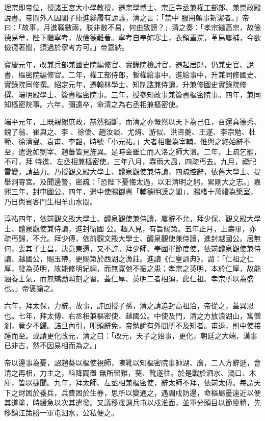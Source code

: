 \begin{pinyinscope}
 理宗即帝位，授諸王宮大小學教授，遷宗學博士、宗正寺丞兼權工部郎、兼崇政殿說書。帝問外人因閣子庫進絲履有謗議，清之言：「禁中
 服用頗事新潔者。」帝曰：「故事，月進鞵數兩，朕非敝不易，何由致謗？」清之奏：「孝宗繼高宗，故儉德易章，陛下繼寧考，故儉德難著。寧考自奉如寒士，衣領重浣，革舄屢補，今欲儉德著聞，須過於寧考方可。」帝嘉納。



 寶慶元年，改兼兵部兼國史院編修官、實錄院檢討官，遷起居郎，仍兼史官、說書、樞密院編修官。二年，權工部侍郎，暫權給事中，進給事中，升兼同修國史、實錄院同修撰。紹定元年，遷翰林學士、知制誥兼侍讀，升兼修國史實錄院修
 撰、端明殿學士、簽書樞密院事。三年，授參知政事兼簽書樞密院事。四年，兼同知樞密院事。六年，彌遠卒，命清之為右丞相兼樞密使。



 端平元年，上既親總庶政，赫然獨斷，而清之亦慨然以天下為己任，召還真德秀、魏了翁、崔與之、李𡌴、徐僑、趙汝談、尤焴、游似、洪咨夔、王遂、李宗勉、杜範、徐清叟、袁甫、李韶，時號「小元祐。」大者相繼為宰輔，惟與之終始辭不至，遣逸如劉宰、趙蕃皆見旌異。是時金雖亡而入洛之師大潰。二年，上疏乞罷，不可，拜
 特進、左丞相兼樞密使。三年八月，霖雨大風，四疏丐去。九月，禋祀雷變，請益力。乃授觀文殿大學士、醴泉觀使兼侍讀，四疏控辭，依舊大學士、提舉洞霄宮。及聞邊警，密疏：「恐陛下憂悔太過，以汩清明之躬，累剛大之志。」嘉熙三年，封申國公。四年，遣中使賜御書「輔德明謨之閣」，賜楮十萬緡為築室，乃日與賓客門生相羊山水間。



 淳祐四年，依前觀文殿大學士、醴泉觀使兼侍讀，屢辭不允，拜少保、觀文殿大學士、醴泉觀使兼侍讀，進封衛國
 公。趣入見，有旨賜第。五年正月，上壽畢，亦疏丐歸，不允。拜少傅，依前觀文殿大學士、醴泉觀使兼侍讀，進封越國公。居無何，喪其子士昌，決意東還，又不許。拜少師、奉國軍節度使，依前醴泉觀使兼侍讀、越國公，賜玉帶，更賜第於西湖之漁莊。進讀《仁皇訓典》，謂：「仁祖之仁厚，發為英明，故能修明紀綱，而無寬弛不振之患；孝宗之英明，本於仁厚，故能涵養士氣，而無矯勵峭刻之習。蓋仁厚、英明二者相須，此仁祖、孝宗所以為盛也。」帝褒諭之。



 六年，拜太保，力辭。故事，許回授子孫，清之請追封高祖洽，帝從之，蓋異恩也。七年，拜太傅、右丞相兼樞密使、越國公。中使及門，清之方放浪湖山，寓僧剎，竟夕不歸。詰旦內引，叩頭辭免，帝勉諭有外間所不及知者。甫退，則中使接踵而至。或請更化改元，清之曰：「改元，天子之始事，更化，朝廷之大端，漢事已非古，然不因易相而為之。」



 帝以邊事為憂，詔趙葵以樞使視師，陳靴以知樞密院事帥湖、廣，二人方辭遜，會清之再相，力主之，科降闢置
 無所留難，葵、靴遂往。於是戰於泗水、渦口、木庫，皆以捷聞。九年，拜太師、左丞相兼樞密使，辭太師不拜，依前太傅。每謂天下之財困於養兵，兵費困於生券，思所以變通之，遇調戍防邊，命樞屬量遠近以便其道塗，時緩急以次其遣發。又議移歲調兵屯以戍淮面，並軍分頭目以節廩稍，先移鎮江策勝一軍屯泗水，公私便之。




\end{pinyinscope}
